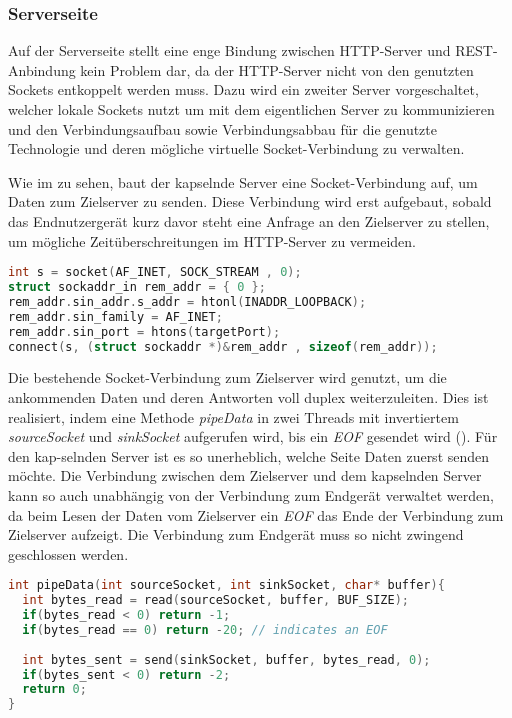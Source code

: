     \subsubsection{Serverseite}        
        Auf der Serverseite stellt eine enge Bindung zwischen HTTP-Server und REST-Anbindung kein Problem dar, da der HTTP-Server nicht von den genutzten Sockets entkoppelt werden muss. Dazu wird ein zweiter Server vorgeschaltet, welcher lokale Sockets nutzt um mit dem eigentlichen Server zu kommunizieren und den Verbindungsaufbau sowie Verbindungsabbau für die genutzte Technologie und deren mögliche virtuelle Socket-Verbindung zu verwalten.
        
        Wie im  zu sehen, baut der kapselnde Server eine Socket-Verbindung auf, um Daten zum Zielserver zu senden. Diese Verbindung wird erst aufgebaut, sobald das Endnutzergerät kurz davor steht eine Anfrage an den Zielserver zu stellen, um mögliche Zeitüberschreitungen im HTTP-Server zu vermeiden.

        \begin{lstlisting}[frame=bt, label={lst:socket:create}, language=C, caption=Instanziierung eines Sockets (Servercode in C)]
int s = socket(AF_INET, SOCK_STREAM , 0);
struct sockaddr_in rem_addr = { 0 };
rem_addr.sin_addr.s_addr = htonl(INADDR_LOOPBACK);
rem_addr.sin_family = AF_INET;
rem_addr.sin_port = htons(targetPort);
connect(s, (struct sockaddr *)&rem_addr , sizeof(rem_addr));
        \end{lstlisting}        
        
        Die bestehende Socket-Verbindung zum Zielserver wird genutzt, um die ankommenden Daten und deren Antworten voll duplex weiterzuleiten. Dies ist realisiert, indem eine Methode {\it pipeData} in zwei Threads mit invertiertem {\it sourceSocket} und {\it sinkSocket} aufgerufen wird, bis ein {\it EOF} gesendet wird (). Für den kap-selnden Server ist es so unerheblich, welche Seite Daten zuerst senden möchte. Die Verbindung zwischen dem Zielserver und dem kapselnden Server kann so auch unabhängig von der Verbindung zum Endgerät verwaltet werden, da beim Lesen der Daten vom Zielserver ein {\it EOF} das Ende der Verbindung zum Zielserver aufzeigt. Die Verbindung zum Endgerät muss so nicht zwingend geschlossen werden.
        
        \begin{lstlisting}[frame=bt, label={lst:socket:data}, language=C, caption=Datenweiterleitung durch Sockets (Servercode in C)] 
int pipeData(int sourceSocket, int sinkSocket, char* buffer){
  int bytes_read = read(sourceSocket, buffer, BUF_SIZE);
  if(bytes_read < 0) return -1;
  if(bytes_read == 0) return -20; // indicates an EOF
  
  int bytes_sent = send(sinkSocket, buffer, bytes_read, 0);
  if(bytes_sent < 0) return -2;
  return 0;
}
        \end{lstlisting}
        
